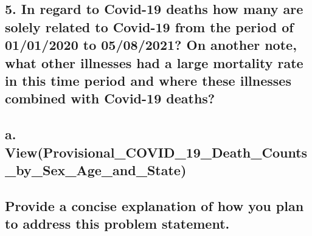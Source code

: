 \documentclass[
]{article}
\begin{document}
\hypertarget{in-regard-to-covid-19-deaths-how-many-are-solely-related-to-covid-19-from-the-period-of-01012020-to-05082021-on-another-note-what-other-illnesses-had-a-large-mortality-rate-in-this-time-period-and-where-these-illnesses-combined-with-covid-19-deaths}{%
\subsection{5. In regard to Covid-19 deaths how many are solely related
to Covid-19 from the period of 01/01/2020 to 05/08/2021? On another
note, what other illnesses had a large mortality rate in this time
period and where these illnesses combined with Covid-19
deaths?}\label{in-regard-to-covid-19-deaths-how-many-are-solely-related-to-covid-19-from-the-period-of-01012020-to-05082021-on-another-note-what-other-illnesses-had-a-large-mortality-rate-in-this-time-period-and-where-these-illnesses-combined-with-covid-19-deaths}}

\hypertarget{a.-viewprovisional_covid_19_death_counts_by_sex_age_and_state}{%
\subsection{a.
View(Provisional\_COVID\_19\_Death\_Counts\_by\_Sex\_Age\_and\_State)}\label{a.-viewprovisional_covid_19_death_counts_by_sex_age_and_state}}

\hypertarget{provide-a-concise-explanation-of-how-you-plan-to-address-this-problem-statement.}{%
\subsection{Provide a concise explanation of how you plan to address
this problem
statement.}\label{provide-a-concise-explanation-of-how-you-plan-to-address-this-problem-statement.}}
\end{document}
